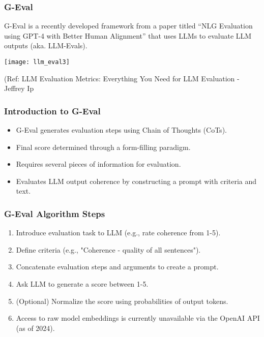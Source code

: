 \begin{frame}[fragile]\frametitle{G-Eval}

G-Eval is a recently developed framework from a paper titled ``NLG Evaluation using GPT-4 with Better Human Alignment'' that uses LLMs to evaluate LLM outputs (aka. LLM-Evals).

\begin{center}
\texttt{[image: llm\_eval3]}
\end{center}		
		
{\tiny (Ref: LLM Evaluation Metrics: Everything You Need for LLM Evaluation - Jeffrey Ip}
			
			
\end{frame}

\begin{frame}[fragile]\frametitle{Introduction to G-Eval}
  \begin{itemize}
    \item G-Eval generates evaluation steps using Chain of Thoughts (CoTs).
    \item Final score determined through a form-filling paradigm.
    \item Requires several pieces of information for evaluation.
    \item Evaluates LLM output coherence by constructing a prompt with criteria and text.
  \end{itemize}
\end{frame}

\begin{frame}[fragile]\frametitle{G-Eval Algorithm Steps}
  \begin{enumerate}
    \item Introduce evaluation task to LLM (e.g., rate coherence from 1-5).
    \item Define criteria (e.g., "Coherence - quality of all sentences").
    \item Concatenate evaluation steps and arguments to create a prompt.
    \item Ask LLM to generate a score between 1-5.
    \item (Optional) Normalize the score using probabilities of output tokens.
    \item Access to raw model embeddings is currently unavailable via the OpenAI API (as of 2024).
  \end{enumerate}
\end{frame}


